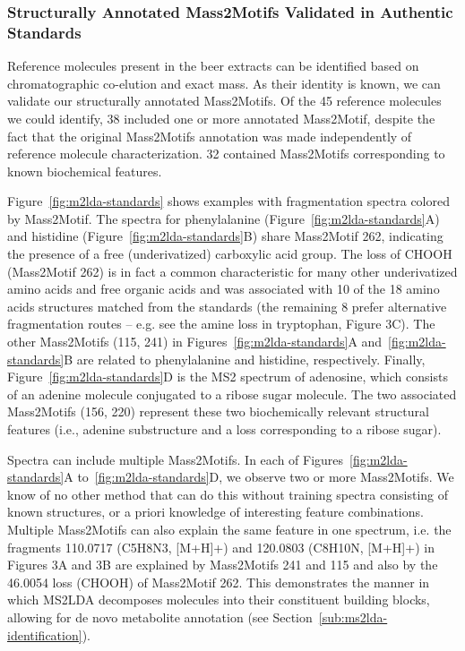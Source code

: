\subsubsection{Structurally Annotated Mass2Motifs Validated in Authentic Standards}

Reference molecules present in the beer extracts can be identified based on chromatographic co-elution  and exact mass. As their identity is known, we can validate our structurally annotated Mass2Motifs. Of the 45 reference molecules we could identify, 38 included one or more annotated Mass2Motif, despite the fact that the original Mass2Motifs annotation was made independently of reference molecule characterization. 32 contained Mass2Motifs corresponding to known biochemical features.

Figure~\ref{fig:m2lda-standards} shows examples with fragmentation spectra colored by Mass2Motif. The spectra for phenylalanine (Figure~\ref{fig:m2lda-standards}A) and histidine (Figure~\ref{fig:m2lda-standards}B) share Mass2Motif 262, indicating the presence of a free (underivatized) carboxylic acid group. The loss of CHOOH (Mass2Motif 262) is in fact a common characteristic for many other underivatized amino acids and free organic acids and was associated with 10 of the 18 amino acids structures matched from the standards (the remaining 8 prefer alternative fragmentation routes – e.g. see the amine loss in tryptophan, Figure 3C). The other Mass2Motifs (115, 241) in Figures~\ref{fig:m2lda-standards}A and~\ref{fig:m2lda-standards}B are related to phenylalanine and histidine, respectively. Finally, Figure~\ref{fig:m2lda-standards}D is the MS2 spectrum of adenosine, which consists of an adenine molecule conjugated to a ribose sugar molecule. The two associated Mass2Motifs (156, 220) represent these two biochemically relevant structural features (i.e., adenine substructure and a loss corresponding to a ribose sugar).  

Spectra can include multiple Mass2Motifs. In each of Figures~\ref{fig:m2lda-standards}A to~\ref{fig:m2lda-standards}D, we observe two or more Mass2Motifs. We know of no other method that can do this without training spectra consisting of known structures, or a priori knowledge of interesting feature combinations. Multiple Mass2Motifs can also explain the same feature in one spectrum, i.e. the fragments 110.0717 (C5H8N3, [M+H]+)  and 120.0803 (C8H10N, [M+H]+) in Figures 3A and 3B are explained by Mass2Motifs 241 and 115 and also by the 46.0054 loss (CHOOH) of Mass2Motif 262. This demonstrates the manner in which MS2LDA decomposes molecules into their constituent building blocks, allowing for de novo metabolite annotation (see Section~\ref{sub:ms2lda-identification}). 

